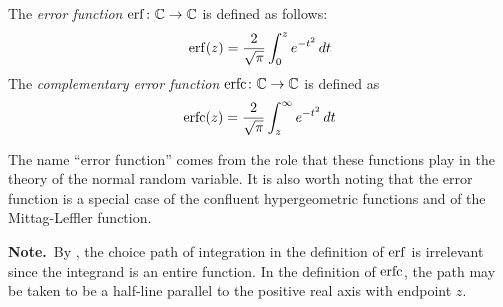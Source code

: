 \documentclass[12pt]{article}
\begin{document}
The \emph{error function} ${\rm erf} \colon \mathbb{C} \to \mathbb{C}$ is defined as follows:
 $${\rm erf} (z) = {2 \over \sqrt{\pi}} \int_0^z e^{-t^2} \, dt$$
The \emph{complementary error function} ${\rm erfc} \colon \mathbb{C} \to \mathbb{C}$ is defined as
 $${\rm erfc} (z) = {2 \over \sqrt{\pi}} \int_z^\infty e^{-t^2} \, dt$$

The name ``error function'' comes from the role that these functions play in the theory of the normal random variable.  It is also worth noting that the error function is a special case of the confluent hypergeometric functions and of the Mittag-Leffler function.

\textbf{Note.}\,  By , the choice path of integration in the definition of ${\rm erf}$ is irrelevant since the integrand is an entire function.   In the definition of ${\rm erfc}$, the path may be taken to be a half-line parallel to the positive real axis with endpoint $z$.

\end{document}
